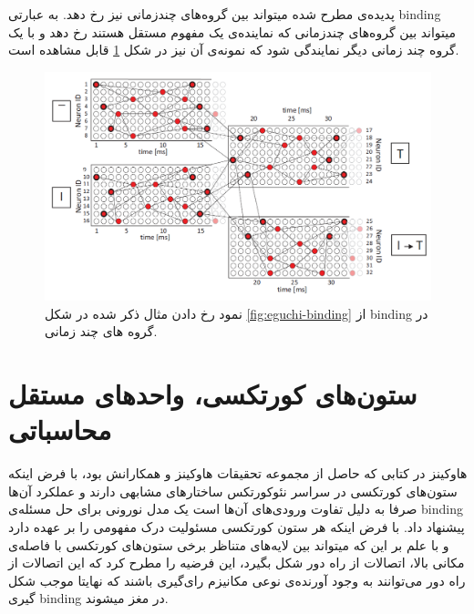 \documentclass[12pt]{report}
\begin{document}
	پدیده‌ی مطرح شده میتواند بین گروه‌های چندزمانی نیز رخ دهد. به عبارتی \gls{binding} میتواند بین گروه‌های چندزمانی که نماینده‌ی یک مفهوم مستقل هستند رخ دهد و با یک گروه چند زمانی دیگر نمایندگی شود که نمونه‌ی آن نیز در شکل \ref{fig:eguchi-binding-group} قابل مشاهده است.
	
	\begin{figure}[H]
		\centering
		\includegraphics[width=0.7\linewidth]{poly-group-bind.png}
		\caption[NS]{
			نمود رخ دادن مثال ذکر شده در شکل \ref{fig:eguchi-binding}  از \gls{binding} در گروه های چند زمانی.
		}
		\label{fig:eguchi-binding-group}
	\end{figure}
	
	\section{ستون‌های کورتکسی، واحد‌های مستقل محاسباتی}
	هاوکینز در کتابی \cite{Hawkins2021-rq} که حاصل از مجموعه تحقیقات هاوکینز و همکارانش
	\cite{Hawkins2016, Hawkins2017, Lewis2019}
	بود، با فرض اینکه ستون‌های کورتکسی در سراسر نئوکورتکس ساختار‌های مشابهی دارند و عملکرد آن‌ها صرفا به دلیل تفاوت ورودی‌های آن‌ها است \cite{Mountcastle1978} یک مدل نورونی برای حل مسئله‌ی \gls{binding} پیشنهاد داد. با فرض اینکه هر ستون کورتکسی مسئولیت درک مفهومی را بر عهده دارد و با علم بر این که میتواند بین لایه‌های متناظر برخی ستون‌های کورتکسی با فاصله‌ی مکانی بالا، اتصالات از راه دور شکل بگیرد، این فرضیه را مطرح کرد که این اتصالات از راه دور می‌توانند به وجود آورنده‌ی نوعی مکانیزم رای‌گیری باشند که نهایتا موجب شکل گیری \gls{binding} در مغز میشوند.
	
\end{document}
